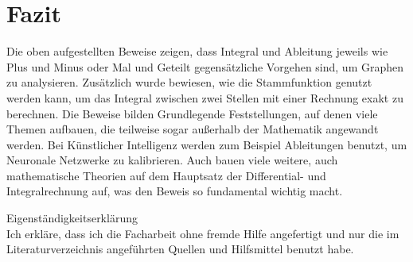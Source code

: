 \documentclass[fontsize=12pt,paper=a4,DIV12,cleardoublepage=empty, 
liststotoc,idxtotoc,bibtotoc]{article}
\theoremstyle{plain}
\theoremstyle{definition}
\begin{document}
	\section{Fazit}
	Die oben aufgestellten Beweise zeigen, dass Integral und Ableitung jeweils wie Plus und Minus oder Mal und Geteilt gegensätzliche Vorgehen sind, um Graphen zu analysieren. Zusätzlich wurde bewiesen, wie die Stammfunktion genutzt werden kann, um das Integral zwischen zwei Stellen mit einer Rechnung exakt zu berechnen. Die Beweise bilden Grundlegende Feststellungen, auf denen viele Themen aufbauen, die teilweise sogar außerhalb der Mathematik angewandt werden. Bei Künstlicher Intelligenz werden zum Beispiel Ableitungen benutzt, um Neuronale Netzwerke zu kalibrieren. Auch bauen viele weitere, auch mathematische Theorien auf dem Hauptsatz der Differential- und Integralrechnung auf, was den Beweis so fundamental wichtig macht.
	\newpage
	
	
	\nocite{*}
	\printbibliography[title=Literaturverzeichnis]
	\newpage
	\huge Eigenständigkeitserklärung \normalsize\\
	Ich erkläre, dass ich die Facharbeit ohne fremde Hilfe angefertigt und nur die im
Literaturverzeichnis angeführten Quellen und Hilfsmittel benutzt habe.\\

\begin{flushleft}
\makebox[.4\textwidth]{\hrulefill}\hfill \makebox[.4\textwidth]{\hrulefill}\\
\hfill
{}\\
\end{flushleft}
\end{document}
